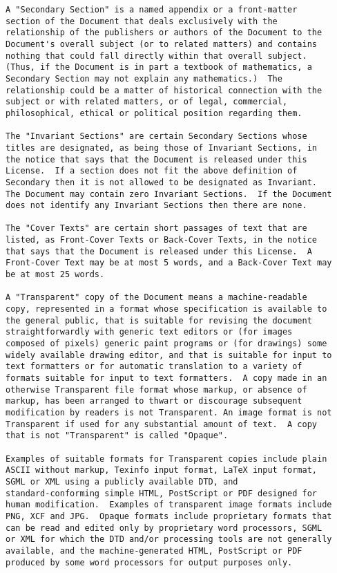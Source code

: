 \begin{verbatim}
A "Secondary Section" is a named appendix or a front-matter
section of the Document that deals exclusively with the
relationship of the publishers or authors of the Document to the
Document's overall subject (or to related matters) and contains
nothing that could fall directly within that overall subject.
(Thus, if the Document is in part a textbook of mathematics, a
Secondary Section may not explain any mathematics.)  The
relationship could be a matter of historical connection with the
subject or with related matters, or of legal, commercial,
philosophical, ethical or political position regarding them.

The "Invariant Sections" are certain Secondary Sections whose
titles are designated, as being those of Invariant Sections, in
the notice that says that the Document is released under this
License.  If a section does not fit the above definition of
Secondary then it is not allowed to be designated as Invariant.
The Document may contain zero Invariant Sections.  If the Document
does not identify any Invariant Sections then there are none.

The "Cover Texts" are certain short passages of text that are
listed, as Front-Cover Texts or Back-Cover Texts, in the notice
that says that the Document is released under this License.  A
Front-Cover Text may be at most 5 words, and a Back-Cover Text may
be at most 25 words.

A "Transparent" copy of the Document means a machine-readable
copy, represented in a format whose specification is available to
the general public, that is suitable for revising the document
straightforwardly with generic text editors or (for images
composed of pixels) generic paint programs or (for drawings) some
widely available drawing editor, and that is suitable for input to
text formatters or for automatic translation to a variety of
formats suitable for input to text formatters.  A copy made in an
otherwise Transparent file format whose markup, or absence of
markup, has been arranged to thwart or discourage subsequent
modification by readers is not Transparent. An image format is not
Transparent if used for any substantial amount of text.  A copy
that is not "Transparent" is called "Opaque".

Examples of suitable formats for Transparent copies include plain
ASCII without markup, Texinfo input format, LaTeX input format,
SGML or XML using a publicly available DTD, and
standard-conforming simple HTML, PostScript or PDF designed for
human modification.  Examples of transparent image formats include
PNG, XCF and JPG.  Opaque formats include proprietary formats that
can be read and edited only by proprietary word processors, SGML
or XML for which the DTD and/or processing tools are not generally
available, and the machine-generated HTML, PostScript or PDF
produced by some word processors for output purposes only.


\end{verbatim}

